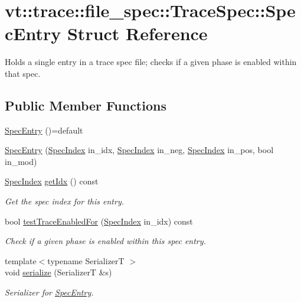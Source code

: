 \hypertarget{structvt_1_1trace_1_1file__spec_1_1_trace_spec_1_1_spec_entry}{}\section{vt\+:\+:trace\+:\+:file\+\_\+spec\+:\+:Trace\+Spec\+:\+:Spec\+Entry Struct Reference}
\label{structvt_1_1trace_1_1file__spec_1_1_trace_spec_1_1_spec_entry}


Holds a single entry in a trace spec file; checks if a given phase is enabled within that spec.  


\subsection*{Public Member Functions}
\begin{DoxyCompactItemize}
\item 
\hyperlink{structvt_1_1trace_1_1file__spec_1_1_trace_spec_1_1_spec_entry_a84fd2cd12c47dbef7c5c5daf41880d48}{Spec\+Entry} ()=default
\item 
\hyperlink{structvt_1_1trace_1_1file__spec_1_1_trace_spec_1_1_spec_entry_a88637cca75e7e629e94194d031f6695b}{Spec\+Entry} (\hyperlink{structvt_1_1trace_1_1file__spec_1_1_trace_spec_a4dd2e8fb971930351812d0f286baece2}{Spec\+Index} in\+\_\+idx, \hyperlink{structvt_1_1trace_1_1file__spec_1_1_trace_spec_a4dd2e8fb971930351812d0f286baece2}{Spec\+Index} in\+\_\+neg, \hyperlink{structvt_1_1trace_1_1file__spec_1_1_trace_spec_a4dd2e8fb971930351812d0f286baece2}{Spec\+Index} in\+\_\+pos, bool in\+\_\+mod)
\item 
\hyperlink{structvt_1_1trace_1_1file__spec_1_1_trace_spec_a4dd2e8fb971930351812d0f286baece2}{Spec\+Index} \hyperlink{structvt_1_1trace_1_1file__spec_1_1_trace_spec_1_1_spec_entry_a288d88c01c82a6ba85c5565f359b5ba7}{get\+Idx} () const
\begin{DoxyCompactList}\small\item\em Get the spec index for this entry. \end{DoxyCompactList}\item 
bool \hyperlink{structvt_1_1trace_1_1file__spec_1_1_trace_spec_1_1_spec_entry_a9e82463df70d9eef5b019fe01ba6c8ec}{test\+Trace\+Enabled\+For} (\hyperlink{structvt_1_1trace_1_1file__spec_1_1_trace_spec_a4dd2e8fb971930351812d0f286baece2}{Spec\+Index} in\+\_\+idx) const
\begin{DoxyCompactList}\small\item\em Check if a given phase is enabled within this spec entry. \end{DoxyCompactList}\item 
{\footnotesize template$<$typename SerializerT $>$ }\\void \hyperlink{structvt_1_1trace_1_1file__spec_1_1_trace_spec_1_1_spec_entry_aedd34ee25948ee8f8ee4a7909c554313}{serialize} (SerializerT \&s)
\begin{DoxyCompactList}\small\item\em Serializer for {\ttfamily \hyperlink{structvt_1_1trace_1_1file__spec_1_1_trace_spec_1_1_spec_entry}{Spec\+Entry}}. \end{DoxyCompactList}\end{DoxyCompactItemize}
